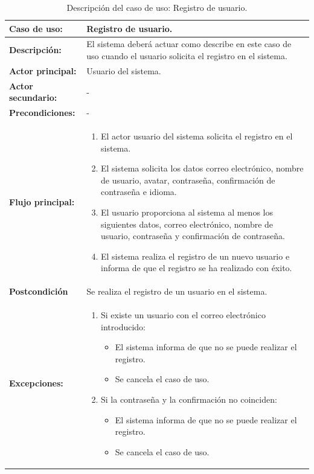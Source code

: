 \begin{table}[H]
  \begin{center}
    \begin{tabular}{|p{3.5cm}|p{10cm}|}
      \hline
      {\textbf{Caso de uso:}} & { Registro de usuario.} \\
      \hline
      {\textbf{Descripción:}} & { El sistema deberá actuar como describe en este caso de uso cuando el usuario solicita el registro en el sistema.} \\
     \hline
      {\textbf{Actor principal:}} & { Usuario del sistema.} \\
      \hline
      {\textbf{Actor secundario:}} & { - } \\
      \hline
      {\textbf{Precondiciones:}} & { - } \\
     \hline   
    {\textbf{Flujo principal:}} & { 
      \begin{enumerate}
	\item El actor usuario del sistema solicita el registro en el sistema.
	\item El sistema solicita los datos correo electrónico, nombre de usuario, avatar, contraseña, confirmación de contraseña e idioma.
	\item El usuario proporciona al sistema al menos los siguientes datos, correo electrónico, nombre de usuario, contraseña y confirmación de contraseña.
	\item El sistema realiza el registro de un nuevo usuario e informa de que el registro se ha realizado con éxito.
      \end{enumerate}
      } \\
     \hline
     {\textbf{Postcondición}} & {Se realiza el registro de un usuario en el sistema.}\\
     \hline
         {\textbf{Excepciones:}} & {
         \begin{enumerate}
          \item Si existe un usuario con el correo electrónico introducido:
          \begin{itemize}
           \item El sistema informa de que no se puede realizar el registro.
           \item Se cancela el caso de uso.
          \end{itemize}
	  \item Si la contraseña y la confirmación no coinciden:
	    \begin{itemize}
	      \item El sistema informa de que no se puede realizar el registro.
	      \item Se cancela el caso de uso.
	    \end{itemize}
         \end{enumerate}
         }\\
     \hline
    \end{tabular}
  \end{center}
\caption{Descripción del caso de uso: Registro de usuario.}
\end{table}




